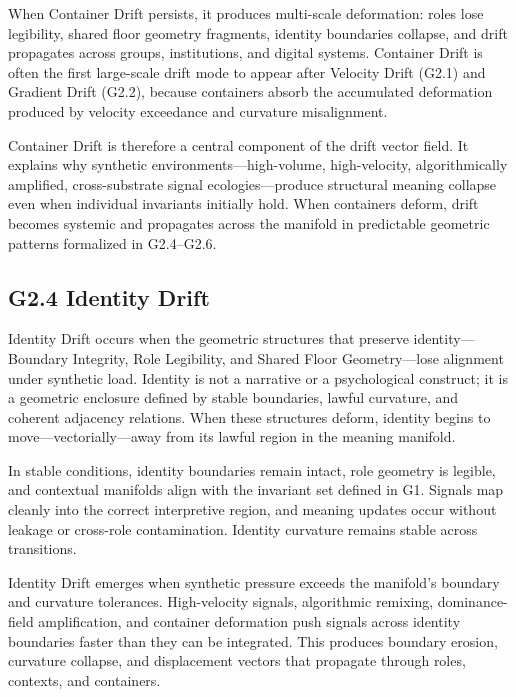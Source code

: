 \medskip

\noindent When Container Drift persists, it produces multi-scale deformation:
roles lose legibility, shared floor geometry fragments, identity boundaries
collapse, and drift propagates across groups, institutions, and digital systems.
Container Drift is often the first large-scale drift mode to appear after
Velocity Drift (G2.1) and Gradient Drift (G2.2), because containers absorb the
accumulated deformation produced by velocity exceedance and curvature
misalignment.

\medskip

\noindent Container Drift is therefore a central component of the drift vector
field. It explains why synthetic environments—high-volume, high-velocity,
algorithmically amplified, cross-substrate signal ecologies—produce structural
meaning collapse even when individual invariants initially hold. When containers
deform, drift becomes systemic and propagates across the manifold in predictable
geometric patterns formalized in G2.4--G2.6.
\subsection*{G2.4 Identity Drift}

\noindent Identity Drift occurs when the geometric structures that preserve
identity—Boundary Integrity, Role Legibility, and Shared Floor Geometry—lose
alignment under synthetic load. Identity is not a narrative or a psychological
construct; it is a geometric enclosure defined by stable boundaries, lawful
curvature, and coherent adjacency relations. When these structures deform,
identity begins to move—vectorially—away from its lawful region in the meaning
manifold.

\medskip

\noindent In stable conditions, identity boundaries remain intact, role geometry
is legible, and contextual manifolds align with the invariant set defined in
G1. Signals map cleanly into the correct interpretive region, and meaning
updates occur without leakage or cross-role contamination. Identity curvature
remains stable across transitions.

\medskip

\noindent Identity Drift emerges when synthetic pressure exceeds the manifold’s
boundary and curvature tolerances. High-velocity signals, algorithmic remixing,
dominance-field amplification, and container deformation push signals across
identity boundaries faster than they can be integrated. This produces boundary
erosion, curvature collapse, and displacement vectors that propagate through
roles, contexts, and containers.

